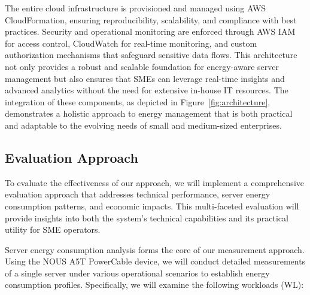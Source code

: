 The entire cloud infrastructure is provisioned and managed using AWS CloudFormation, ensuring reproducibility, scalability, and compliance with best practices. Security and operational monitoring are enforced through AWS IAM for access control, CloudWatch for real-time monitoring, and custom authorization mechanisms that safeguard sensitive data flows. This architecture not only provides a robust and scalable foundation for energy-aware server management but also ensures that SMEs can leverage real-time insights and advanced analytics without the need for extensive in-house IT resources. The integration of these components, as depicted in Figure~\ref{fig:architecture}, demonstrates a holistic approach to energy management that is both practical and adaptable to the evolving needs of small and medium-sized enterprises.

\subsection{Evaluation Approach}
To evaluate the effectiveness of our approach, we will implement a comprehensive
evaluation approach that addresses technical performance, server energy
consumption patterns, and economic impacts. This multi-faceted evaluation will
provide insights into both the system's technical capabilities and its practical
utility for SME operators.

Server energy consumption analysis forms the core of our measurement approach.
Using the NOUS A5T PowerCable device, we will conduct detailed measurements of a
single server under various operational scenarios to establish energy consumption
profiles. Specifically, we will examine the following workloads (WL):

